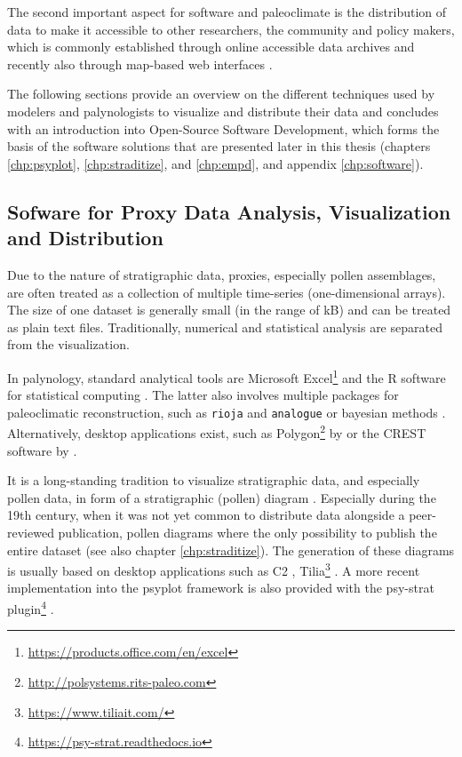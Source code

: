 \begin{refsection}
The second important aspect for software and paleoclimate is the distribution of data to make it accessible to other researchers, the community and policy makers, which is commonly established through online accessible data archives and recently also through map-based web interfaces \citep{WilliamsGrimmBloisEtAl2018, BollietBrockmannMassonDelmotteEtAl2016}.

The following sections provide an overview on the different techniques used by modelers and palynologists to visualize and distribute their data and concludes with an introduction into Open-Source Software Development, which forms the basis of the software solutions that are presented later in this thesis (chapters \ref{chp:psyplot}, \ref{chp:straditize}, and \ref{chp:empd}, and appendix \ref{chp:software}).

\subsection{Sofware for Proxy Data Analysis, Visualization and Distribution} \label{sec:intro-software-data}

Due to the nature of stratigraphic data, proxies, especially pollen assemblages, are often treated as a collection of multiple time-series (one-dimensional arrays). The size of one dataset is generally small (in the range of kB) and can be treated as plain text files. Traditionally, numerical and statistical analysis are separated from the visualization. 

In palynology, standard analytical tools are Microsoft Excel\footnote{\url{https://products.office.com/en/excel}} and the R software for statistical computing \citep{RCT2019}. The latter also involves multiple packages for paleoclimatic reconstruction, such as \texttt{rioja} \citep{Juggins2017} and \texttt{analogue} \citep{SimpsonOksanen2019, Simpson2007} or bayesian methods \citep{NolanTiptonBoothEtAl2019, Tipton2017}. Alternatively, desktop applications exist, such as Polygon\footnote{\url{http://polsystems.rits-paleo.com}} by \cite{NakagawaTarasovNishidaEtAl2002} or the CREST software by \cite{ChevalierCheddadiChase2014, Chevalier2019}.

It is a long-standing tradition to visualize stratigraphic data, and especially pollen data, in form of a stratigraphic (pollen) diagram \citep{Bradley1985, Grimm1988}. Especially during the 19th century, when it was not yet common to distribute data alongside a peer-reviewed publication, pollen diagrams where the only possibility to publish the entire dataset (see also chapter \ref{chp:straditize}). The generation of these diagrams is usually based on desktop applications such as C2 \citep{Juggins2007}, Tilia\footnote{\url{https://www.tiliait.com/}} \citep{Grimm1988, Grimm1991}. A more recent implementation into the psyplot framework \citep[chapter \ref{chp:psyplot}]{Sommer2017} is also provided with the psy-strat plugin\footnote{\url{https://psy-strat.readthedocs.io}} \citep{Sommer2019}.


\end{refsection}
